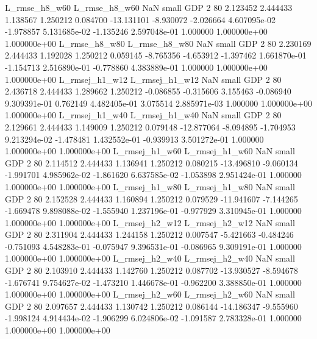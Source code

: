 L_rmse_h8_w60  L_rmse_h8_w60                   NaN      small      GDP                 2 80 2.123452       2.444433 1.138567       1.250212    0.084700    -13.131101     -8.930072    -2.026664   4.607095e-02 -1.978857 5.131685e-02    -1.135246   2.597048e-01            1.000000    1.000000e+00        1.000000e+00
 L_rmse_h8_w80  L_rmse_h8_w80                   NaN      small      GDP                 2 80 2.230169       2.444433 1.192028       1.250212    0.059145     -8.765356     -4.653912    -1.397462   1.661870e-01 -1.154713 2.516890e-01    -0.778860   4.383889e-01            1.000000    1.000000e+00        1.000000e+00
L_rmsej_h1_w12 L_rmsej_h1_w12                   NaN      small      GDP                 2 80 2.436718       2.444433 1.289662       1.250212   -0.086855     -0.315606      3.155463    -0.086940   9.309391e-01  0.762149 4.482405e-01     3.075514   2.885971e-03            1.000000    1.000000e+00        1.000000e+00
L_rmsej_h1_w40 L_rmsej_h1_w40                   NaN      small      GDP                 2 80 2.129661       2.444433 1.149009       1.250212    0.079148    -12.877064     -8.094895    -1.704953   9.213294e-02 -1.478481 1.432552e-01    -0.939913   3.501272e-01            1.000000    1.000000e+00        1.000000e+00
L_rmsej_h1_w60 L_rmsej_h1_w60                   NaN      small      GDP                 2 80 2.114512       2.444433 1.136941       1.250212    0.080215    -13.496810     -9.060134    -1.991701   4.985962e-02 -1.861620 6.637585e-02    -1.053898   2.951424e-01            1.000000    1.000000e+00        1.000000e+00
L_rmsej_h1_w80 L_rmsej_h1_w80                   NaN      small      GDP                 2 80 2.152528       2.444433 1.160894       1.250212    0.079529    -11.941607     -7.144265    -1.669478   9.898088e-02 -1.555940 1.237196e-01    -0.977929   3.310945e-01            1.000000    1.000000e+00        1.000000e+00
L_rmsej_h2_w12 L_rmsej_h2_w12                   NaN      small      GDP                 2 80 2.311904       2.444433 1.244158       1.250212    0.007547     -5.421663     -0.484246    -0.751093   4.548283e-01 -0.075947 9.396531e-01    -0.086965   9.309191e-01            1.000000    1.000000e+00        1.000000e+00
L_rmsej_h2_w40 L_rmsej_h2_w40                   NaN      small      GDP                 2 80 2.103910       2.444433 1.142760       1.250212    0.087702    -13.930527     -8.594678    -1.676741   9.754627e-02 -1.473210 1.446678e-01    -0.962200   3.388850e-01            1.000000    1.000000e+00        1.000000e+00
L_rmsej_h2_w60 L_rmsej_h2_w60                   NaN      small      GDP                 2 80 2.097657       2.444433 1.130742       1.250212    0.086144    -14.186347     -9.555960    -1.998124   4.914434e-02 -1.906299 6.024806e-02    -1.091587   2.783328e-01            1.000000    1.000000e+00        1.000000e+00
